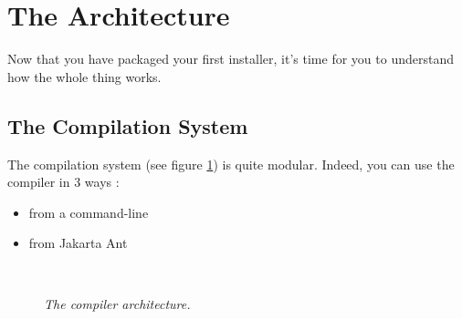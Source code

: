 \section{The \IzPack Architecture}

Now that you have packaged your first installer, it's time for you to understand
how the whole thing works.\\

\subsection{The Compilation System}

The compilation system (see figure \ref{comparch}) is quite modular. 
Indeed, you can use the compiler in 3 ways :
\begin{itemize}
  \item from a command-line
  \item from Jakarta Ant
\end{itemize}\

\begin{figure}[h]
\caption{\label{comparch}
         \textit{The compiler architecture.}}
\begin{center}
\end{center}
\end{figure}

